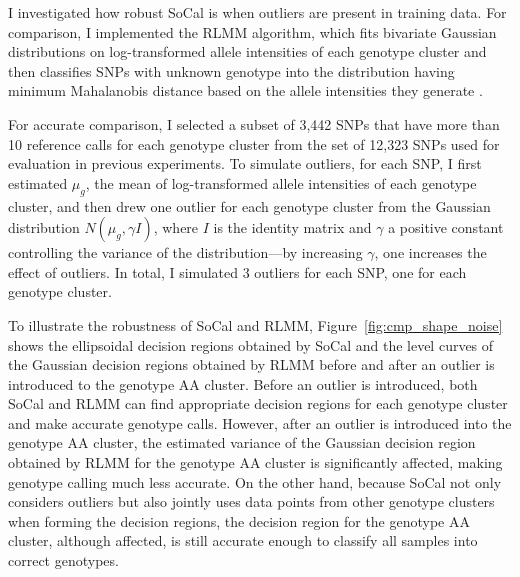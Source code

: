 \documentclass{scrartcl}
\begin{document}
\par
I investigated how robust SoCal is when outliers are present in training data.
For comparison, I implemented the RLMM algorithm, which fits bivariate
Gaussian distributions on log-transformed allele intensities
of each genotype cluster and then classifies SNPs with unknown genotype into
the distribution having minimum Mahalanobis distance based on the allele
intensities they generate \cite{rabbee2005}.

\par
For accurate comparison, I selected a subset of 3,442 SNPs that have
more than 10 reference calls for each genotype cluster from the set of
12,323 SNPs used for evaluation in previous experiments.
To simulate outliers, for each SNP, I first estimated $\mu_g$, the mean of
log-transformed allele intensities of each genotype cluster, and then
drew one outlier for each genotype cluster from the Gaussian distribution
$N(\mu_g, \gamma I)$, where $I$ is the identity matrix and $\gamma$ a
positive constant controlling the variance of the distribution---by increasing
$\gamma$, one increases the effect of outliers.
In total, I simulated 3 outliers for each SNP, one for each genotype cluster.

\par
To illustrate the robustness of SoCal and RLMM,
Figure~\ref{fig:cmp_shape_noise} shows the ellipsoidal decision
regions obtained by SoCal and the level curves of the Gaussian decision regions
obtained by RLMM before and after an outlier is introduced to the genotype AA
cluster.
Before an outlier is introduced, both SoCal and RLMM can find appropriate
decision regions for each genotype cluster and make accurate genotype calls.
However, after an outlier is introduced into the genotype AA cluster, the
estimated variance of the Gaussian decision region obtained by RLMM for the
genotype AA cluster is significantly affected, making genotype calling much
less accurate.
On the other hand, because SoCal not only considers outliers but also
jointly uses data points from other genotype clusters when forming the decision
regions, the decision region for the genotype AA cluster, although affected, is
still accurate enough to classify all samples into correct genotypes.
\end{document}

